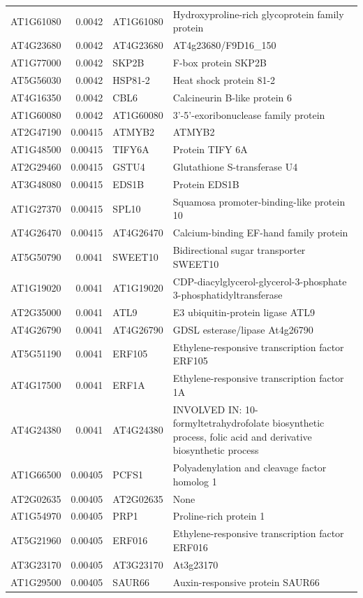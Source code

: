 \documentclass[11pt]{article}
\begin{document}
\begin{center}
\begin{tabular}{lrll}
AT1G61080 & 0.0042 & AT1G61080 & Hydroxyproline-rich glycoprotein family protein\\
AT4G23680 & 0.0042 & AT4G23680 & AT4g23680/F9D16\_150\\
AT1G77000 & 0.0042 & SKP2B & F-box protein SKP2B\\
AT5G56030 & 0.0042 & HSP81-2 & Heat shock protein 81-2\\
AT4G16350 & 0.0042 & CBL6 & Calcineurin B-like protein 6\\
AT1G60080 & 0.0042 & AT1G60080 & 3'-5'-exoribonuclease family protein\\
AT2G47190 & 0.00415 & ATMYB2 & ATMYB2\\
AT1G48500 & 0.00415 & TIFY6A & Protein TIFY 6A\\
AT2G29460 & 0.00415 & GSTU4 & Glutathione S-transferase U4\\
AT3G48080 & 0.00415 & EDS1B & Protein EDS1B\\
AT1G27370 & 0.00415 & SPL10 & Squamosa promoter-binding-like protein 10\\
AT4G26470 & 0.00415 & AT4G26470 & Calcium-binding EF-hand family protein\\
AT5G50790 & 0.0041 & SWEET10 & Bidirectional sugar transporter SWEET10\\
AT1G19020 & 0.0041 & AT1G19020 & CDP-diacylglycerol-glycerol-3-phosphate 3-phosphatidyltransferase\\
AT2G35000 & 0.0041 & ATL9 & E3 ubiquitin-protein ligase ATL9\\
AT4G26790 & 0.0041 & AT4G26790 & GDSL esterase/lipase At4g26790\\
AT5G51190 & 0.0041 & ERF105 & Ethylene-responsive transcription factor ERF105\\
AT4G17500 & 0.0041 & ERF1A & Ethylene-responsive transcription factor 1A\\
AT4G24380 & 0.0041 & AT4G24380 & INVOLVED IN: 10-formyltetrahydrofolate biosynthetic process, folic acid and derivative biosynthetic process\\
AT1G66500 & 0.00405 & PCFS1 & Polyadenylation and cleavage factor homolog 1\\
AT2G02635 & 0.00405 & AT2G02635 & None\\
AT1G54970 & 0.00405 & PRP1 & Proline-rich protein 1\\
AT5G21960 & 0.00405 & ERF016 & Ethylene-responsive transcription factor ERF016\\
AT3G23170 & 0.00405 & AT3G23170 & At3g23170\\
AT1G29500 & 0.00405 & SAUR66 & Auxin-responsive protein SAUR66\\

\end{tabular}
\end{center}
\end{document}
